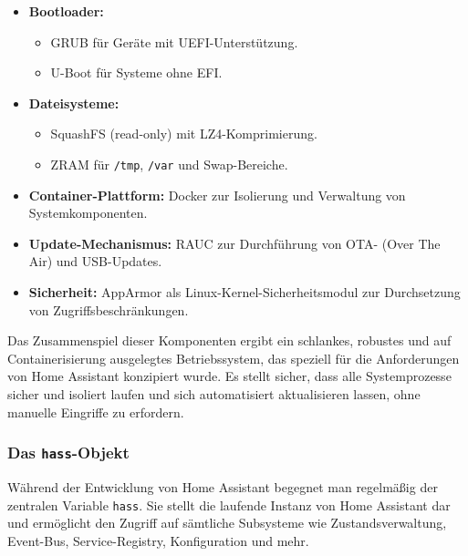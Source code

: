 \begin{itemize}
  \item \textbf{Bootloader:}\\
    \begin{itemize}
      \item GRUB für Geräte mit UEFI-Unterstützung.\\
      \item U-Boot für Systeme ohne EFI.\\
    \end{itemize}
  \item \textbf{Dateisysteme:}\\
    \begin{itemize}
      \item SquashFS (read-only) mit LZ4-Komprimierung.\\
      \item ZRAM für \texttt{/tmp}, \texttt{/var} und Swap-Bereiche.\\
    \end{itemize}
  \item \textbf{Container-Plattform:} Docker zur Isolierung und Verwaltung von Systemkomponenten.\\
  \item \textbf{Update-Mechanismus:} RAUC zur Durchführung von OTA- (Over The Air) und USB-Updates.\\
  \item \textbf{Sicherheit:} AppArmor als Linux-Kernel-Sicherheitsmodul zur Durchsetzung von Zugriffsbeschränkungen.
\end{itemize}

\vspace{0.5em}
\noindent
Das Zusammenspiel dieser Komponenten ergibt ein schlankes, robustes und auf Containerisierung ausgelegtes Betriebssystem, das speziell für die Anforderungen von Home Assistant konzipiert wurde. Es stellt sicher, dass alle Systemprozesse sicher und isoliert laufen und sich automatisiert aktualisieren lassen, ohne manuelle Eingriffe zu erfordern.

\subsubsection{Das \texttt{hass}-Objekt}

Während der Entwicklung von Home Assistant begegnet man regelmäßig der zentralen Variable \texttt{hass}. Sie stellt die laufende Instanz von Home Assistant dar und ermöglicht den Zugriff auf sämtliche Subsysteme wie Zustandsverwaltung, Event-Bus, Service-Registry, Konfiguration und mehr. 


